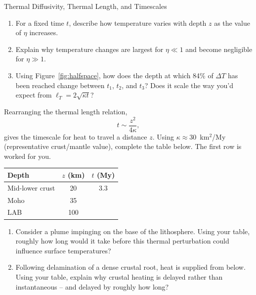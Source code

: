 \begin{activity}{Thermal Diffusivity, Thermal Length, and Timescales}
\begin{questions}
\begin{enumerate}[label=(\alph*)]
  \item For a fixed time $t$, describe how temperature varies with depth $z$ as the value of $\eta$ increases.
  \answerbox[2cm]

  \item Explain why temperature changes are largest for $\eta \ll 1$ and become negligible for $\eta \gg 1$.
  \answerbox[2cm]

  \item Using Figure~\ref{fig:halfspace}, how does the depth at which 84\% of $\Delta T$ has been reached change between $t_1$, $t_2$, and $t_3$? Does it scale the way you'd expect from $\ell_T=2\sqrt{\kappa t}$?
  \answerbox[2cm]
\end{enumerate}


Rearranging the thermal length relation,
\[
t \sim \frac{z^2}{4\kappa},
\]
gives the timescale for heat to travel a distance $z$. Using $\kappa\approx30$~km$^2$/My (representative crust/mantle value), complete the table below. The first row is worked for you.

\begin{center}
\begin{tabular}{lcc}
\toprule
Depth & $z$ (km) & $t$ (My) \\
\midrule
Mid-lower crust & 20  & 3.3 \\
Moho            & 35  & \\
LAB             & 100 & \\
\bottomrule
\end{tabular}
\end{center}

\begin{enumerate}[label=(\alph*)]
  \item Consider a plume impinging on the base of the lithosphere. Using your table, roughly how long would it take before this thermal perturbation could influence surface temperatures?
  \answerbox[2cm]

  \item Following delamination of a dense crustal root, heat is supplied from below. Using your table, explain why crustal heating is delayed rather than instantaneous -- and delayed by roughly how long?
  \answerbox[2.5cm]
\end{enumerate}



\end{questions}
\end{activity}

